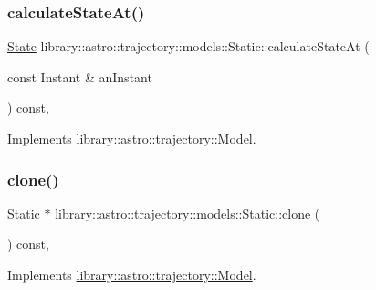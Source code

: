 \subsubsection{\texorpdfstring{calculate\+State\+At()}{calculateStateAt()}}
{\footnotesize\ttfamily \hyperlink{classlibrary_1_1astro_1_1trajectory_1_1_state}{State} library\+::astro\+::trajectory\+::models\+::\+Static\+::calculate\+State\+At (\begin{DoxyParamCaption}\item[{const Instant \&}]{an\+Instant }\end{DoxyParamCaption}) const\hspace{0.3cm}{\ttfamily [override]}, {\ttfamily [virtual]}}



Implements \hyperlink{classlibrary_1_1astro_1_1trajectory_1_1_model_acee9ee770c2ee1d1205b618e8f722ba4}{library\+::astro\+::trajectory\+::\+Model}.

\mbox{\label{classlibrary_1_1astro_1_1trajectory_1_1models_1_1_static_a3586bbfdd6fc3958b18a2ffcb3b23fd4}} 
\subsubsection{\texorpdfstring{clone()}{clone()}}
{\footnotesize\ttfamily \hyperlink{classlibrary_1_1astro_1_1trajectory_1_1models_1_1_static}{Static} $\ast$ library\+::astro\+::trajectory\+::models\+::\+Static\+::clone (\begin{DoxyParamCaption}{ }\end{DoxyParamCaption}) const\hspace{0.3cm}{\ttfamily [override]}, {\ttfamily [virtual]}}



Implements \hyperlink{classlibrary_1_1astro_1_1trajectory_1_1_model_ad6181e14aea57534897e7446a2a27578}{library\+::astro\+::trajectory\+::\+Model}.

\mbox{\label{classlibrary_1_1astro_1_1trajectory_1_1models_1_1_static_a41449e98bb076e0601df67b1cfbff6b8}} 
